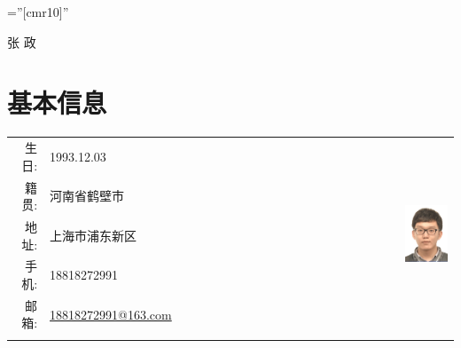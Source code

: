 \documentclass[a4paper,11pt]{article}
\begin{document}

\pagestyle{empty} %

\font\fb=''[cmr10]'' %

\par{
		\begin{center}{\Huge 张 \textsc{政}
	}\end{center}

\par}

\section{基本信息}

\begin{tabular}{rlrr}
  生日:& 1993.12.03 & \quad\quad\quad\quad\quad\quad\quad\quad\quad\quad\quad\quad\quad\quad & \multirow{5}{*}{\includegraphics[width=0.17\textwidth]{my_pic_pro.png}}\\
  籍贯:& 河南省鹤壁市 \\
  地址:& 上海市浦东新区\\
  手机:& 18818272991\\
  邮箱:& \href{mailto:18818272991@163.com}{18818272991@163.com}\\
  \\
\end{tabular}



\end{document}
